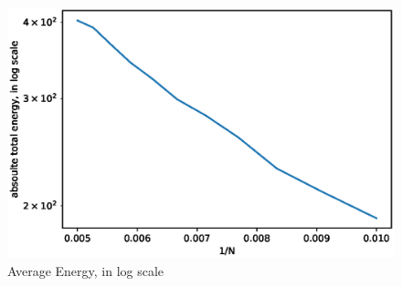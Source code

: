 \documentclass[UTF8,a4paper]{article}
\begin{document}
\begin{figure}[H]
\begin{minipage}[t]{0.6\textwidth}
		\centering
		\includegraphics[height=0.2\textheight]{fig/sc_exp1_loge_hard.eps}
		\caption{Average Energy, in log scale}
	\end{minipage}
\end{figure}
\end{document}
